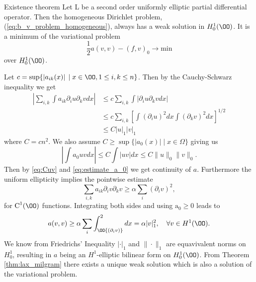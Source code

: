 \begin{thmx}{Existence theorem}
    Let L be a second order uniformly elliptic partial differential operator. Then the homogeneous Dirichlet problem,
     (\ref{eq:b_v_problem_homogeneous}), always has a weak solution in $H_0^1(\OO)$. It is a minimum of the variational problem
    \begin{equation}
        \frac{1}{2} a(v,v) - {(f, v)}_0 \rightarrow \text{min}
    \end{equation}
    over $H_0^1(\OO)$.
\label{thm:existence_hom_dirichlet}
\end{thmx}

\begin{bev}
    Let $c = \sup\{\left| a_{ik}(x) \right| \; | \; x \in \OO, 1 \leq i,k \leq n\}$. Then by the Cauchy-Schwarz inequality we get
    \begin{align}
        \left| \sum_{i,k} \int a_{ik} \partial_i u \partial_k v dx \right| &\leq c \sum_{i,k} \int  \left|  \partial_i u \partial_k v dx\right|\\
        &\leq c \sum_{i,k} {\left[ \int {\left( \partial_i u \right)}^2 dx \int {\left( \partial_k v \right)}^2 dx  \right]}^{1/2} \\
        &\leq C {\left| u \right|}_1 {\left| v \right|}_1 \label{eq:Cuv}
    \end{align}
    where $C=cn^2$. 
    We also assume $C\geq \sup\{|a_0(x)| \; | \; x\in \Omega\}$ giving us
    \begin{equation}
        \left|\int a_0 u v dx \right| \leq C \int |u v| dx \leq C \|u\|_0 \|v\|_0.  
        \label{eq:estimate_a_0}   
    \end{equation}
    Then by \eqref{eq:Cuv} and \eqref{eq:estimate_a_0} we get continuity of $a$.
    Furthermore the uniform ellipticity implies the pointwise estimate %
    \[
        \sum_{i,k} a_{ik} \partial_i v \partial_k v \geq \alpha \sum_i {\left( \partial_i v \right)}^2,
    \]
    for $\text{C}^1(\OO)$ functions. Integrating both sides and using $\text{a}_0 \geq 0$ leads to %
    \begin{equation}
        a(v,v) \geq \alpha \sum_i \int_\OO {\left(\partial_i v\right)}^2 dx = \alpha |v|^2_1, \quad \forall v \in H^1(\OO).
    \end{equation}
    We know from Friedrichs' Inequality $|\cdot|_1$ and $\| \cdot \|_1$ are equavivalent norms on $H_0^1$,
     resulting in $a$ being an $H^1$-elliptic bilinear form on $H_0^1(\OO)$.
    From Theorem \ref{thm:lax_milgram} there exists a unique weak solution which is also a solution of the variational problem.
\end{bev}